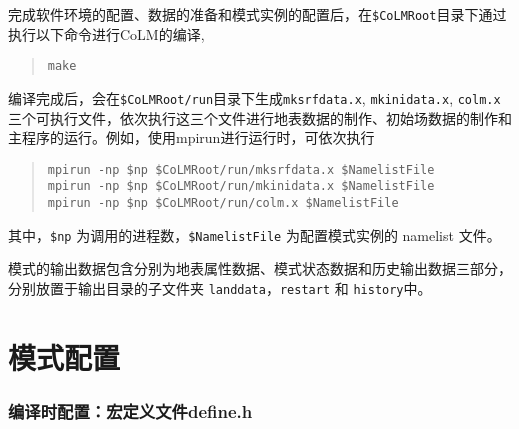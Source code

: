 \documentclass[a4paper,12pt,twoside]{article}
\begin{document}
完成软件环境的配置、数据的准备和模式实例的配置后，在\texttt{\$CoLMRoot}目录下通过执行以下命令进行CoLM的编译,
\begin{quote}
\begin{lstlisting}
make
\end{lstlisting}
\end{quote}
编译完成后，会在\texttt{\$CoLMRoot/run}目录下生成\texttt{mksrfdata.x}, \texttt{mkinidata.x}, \texttt{colm.x} 三个可执行文件，依次执行这三个文件进行地表数据的制作、初始场数据的制作和主程序的运行。例如，使用mpirun进行运行时，可依次执行
\begin{quote}\label{runcolm}
\begin{lstlisting}
mpirun -np $np $CoLMRoot/run/mksrfdata.x $NamelistFile
mpirun -np $np $CoLMRoot/run/mkinidata.x $NamelistFile
mpirun -np $np $CoLMRoot/run/colm.x $NamelistFile
\end{lstlisting}
\end{quote}
其中，\verb|$np| 为调用的进程数，\verb|$NamelistFile| 为配置模式实例的 namelist 文件。

模式的输出数据包含分别为地表属性数据、模式状态数据和历史输出数据三部分，分别放置于输出目录的子文件夹 \texttt{landdata}，\texttt{restart} 和 \texttt{history}中。

\clearpage

\part{模式配置}

\section{编译时配置：宏定义文件define.h}\label{define.hux6587ux4ef6}
\end{document}
